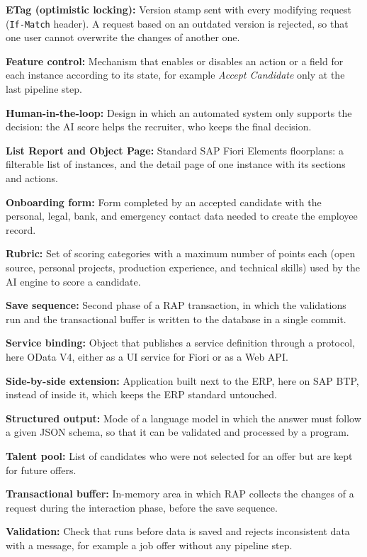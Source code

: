 \noindent\textbf{ETag (optimistic locking):} Version stamp sent with every modifying request (\texttt{If-Match} header). A request based on an outdated version is rejected, so that one user cannot overwrite the changes of another one.

\noindent\textbf{Feature control:} Mechanism that enables or disables an action or a field for each instance according to its state, for example \emph{Accept Candidate} only at the last pipeline step.

\noindent\textbf{Human-in-the-loop:} Design in which an automated system only supports the decision: the AI score helps the recruiter, who keeps the final decision.

\noindent\textbf{List Report and Object Page:} Standard SAP Fiori Elements floorplans: a filterable list of instances, and the detail page of one instance with its sections and actions.

\noindent\textbf{Onboarding form:} Form completed by an accepted candidate with the personal, legal, bank, and emergency contact data needed to create the employee record.

\noindent\textbf{Rubric:} Set of scoring categories with a maximum number of points each (open source, personal projects, production experience, and technical skills) used by the AI engine to score a candidate.

\noindent\textbf{Save sequence:} Second phase of a RAP transaction, in which the validations run and the transactional buffer is written to the database in a single commit.

\noindent\textbf{Service binding:} Object that publishes a service definition through a protocol, here OData V4, either as a UI service for Fiori or as a Web API.

\noindent\textbf{Side-by-side extension:} Application built next to the ERP, here on SAP BTP, instead of inside it, which keeps the ERP standard untouched.

\noindent\textbf{Structured output:} Mode of a language model in which the answer must follow a given JSON schema, so that it can be validated and processed by a program.

\noindent\textbf{Talent pool:} List of candidates who were not selected for an offer but are kept for future offers.

\noindent\textbf{Transactional buffer:} In-memory area in which RAP collects the changes of a request during the interaction phase, before the save sequence.

\noindent\textbf{Validation:} Check that runs before data is saved and rejects inconsistent data with a message, for example a job offer without any pipeline step.

\endgroup

\pagebreak
